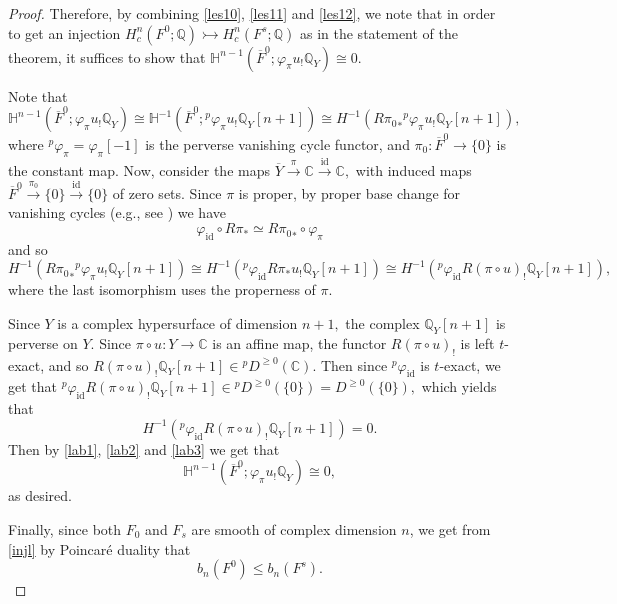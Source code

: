 \documentclass[10pt,a4paper]{amsart}
\numberwithin{equation}{section}  %
\newcommand{\C}{\mathbb{C}}
\newcommand{\Q}{\mathbb{Q}}
\newcommand{\bH}{\mathbb{H}}
\begin{document}
\begin{proof}
Therefore, by combining \eqref{les10}, \eqref{les11} and \eqref{les12}, we note that in order to get an injection $H^n_c(F^0;\Q)  \rightarrowtail H^n_c(F^s;\Q)$ as in the statement of the theorem, it suffices to show that  $\bH^{n-1}(\overline{F}^0; \varphi_{\pi}u_{!}\Q_Y) \cong 0$.


Note that
\begin{equation}\label{lab1}
\bH^{n-1}(\overline{F}^0; \varphi_{\pi}u_{!}\Q_Y) \cong 
\mathbb{H}^{-1}(\overline{F}^0;{}^p\varphi_{\pi}u_{!}\mathbb{Q}_{Y}[n+1])
\cong H^{-1}(R{\pi_0}_*{}^p\varphi_{\pi}u_{!}\mathbb{Q}_{Y}[n+1]),
\end{equation}
where ${}^p\varphi_{\pi}=\varphi_{\pi}[-1]$ is the perverse vanishing cycle functor,  and $\pi_0\colon \overline{F}^0\rightarrow \{0\}$ is the constant map.
 Now, consider the maps $\overline{Y}\xrightarrow{\pi}\mathbb{C}\xrightarrow{\textrm{id}}\mathbb{C},$ with induced maps $\overline{F}^0\xrightarrow{\pi_0} \{0\}\xrightarrow{\textrm{id}} \{0\}$ of zero sets. Since $\pi$ is proper, by proper base change for vanishing cycles (e.g.,  see \cite[Rem.4.3.7]{Sch}) we have
\begin{equation}
    \varphi_{\textrm{id}}\circ R\pi_{*}\simeq R{\pi_{0}}_*\circ \varphi_{\pi}
\end{equation}
and so
\begin{equation}\label{lab2}
H^{-1}(R{\pi_0}_*{}^p\varphi_{\pi}u_{!}\mathbb{Q}_{Y}[n+1])\cong H^{-1}({}^p\varphi_{\textrm{id}} R\pi_{*}u_{!}\mathbb{Q}_{Y}[n+1]) \cong H^{-1}({}^p\varphi_{\textrm{id}}R(\pi \circ u)_{!}\mathbb{Q}_Y[n+1]),
\end{equation}
where the last isomorphism uses the properness of $\pi$. 

Since $Y$ is a complex hypersurface of dimension $n+1,$ the complex $\mathbb{Q}_Y[n+1]$ is perverse on $Y$. Since $\pi \circ u : Y \to \C$ 
is an affine map, the functor $R(\pi \circ u)_{!}$ is left $t$-exact, and so $R(\pi \circ u)_{!}\mathbb{Q}_Y[n+1]\in {}^p D^{\geq 0}(\mathbb{C}).$ Then since ${}^p\varphi_{\textrm{id}}$ is $t$-exact, we get that ${}^p\varphi_{\textrm{id}} R(\pi \circ u)_{!}\mathbb{Q}_Y[n+1]\in {}^pD^{\geq 0}(\{0\})=D^{\geq 0}(\{0\}),$ which yields that 
\begin{equation}\label{lab3}
    H^{-1}({}^p\varphi_{\textrm{id}}R(\pi \circ u)_{!}\mathbb{Q}_Y[n+1])=0.
\end{equation}
Then by \eqref{lab1},  \eqref{lab2} and \eqref{lab3} we get that
\begin{equation}
    \bH^{n-1}(\overline{F}^0; \varphi_{\pi}u_{!}\Q_Y) \cong 0,
\end{equation}
as desired.

Finally, since both $F_0$ and $F_{s}$ are smooth of complex dimension $n$, we get from \eqref{injl} by Poincar\'e duality that \[b_n(F^0) \leq b_n(F^{s}).\]
\end{proof}
\end{document}
